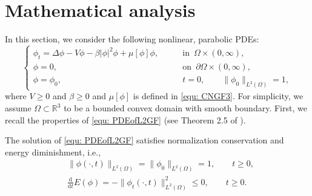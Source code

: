 \documentclass{siamart250211}
\def\R{\mathbb{R}}
\begin{document}
\section{Mathematical analysis}\label{sec: Mathematical analysis}

In this section, we consider the following nonlinear, parabolic PDEs:
\begin{equation}\label{equ: PDEofL2GF}
\begin{cases}
	\phi_t = \Delta \phi - V\phi - \beta |\phi|^2 \phi + \mu[\phi] \phi, \qquad & \text{in}\,\,\, \Omega \times (0,\infty),   \\
	 \phi = 0, \qquad & \text{on}\,\,\,\partial\Omega\times (0,\infty), \\
		\phi = \phi_0, \qquad & t = 0, \qquad \|\phi_0\|_{L^2(\Omega)} = 1,
		\end{cases}
\end{equation}
where $V \ge 0$ and $\beta \ge 0$ and $\mu[\phi]$ is defined in \eqref{equ: CNGF3}. For simplicity, we assume $\Omega \subset \R^3$ to be a bounded convex domain with smooth boundary. First, we recall the properties of \eqref{equ: PDEofL2GF} (see Theorem 2.5 of \cite{bao2004computing}).
\begin{prop}
    The solution of \eqref{equ: PDEofL2GF} satisfies normalization conservation and energy diminishment, i.e., 
    \begin{align*}
        & \|\phi(\cdot,t)\|_{L^2(\Omega)} = \|\phi_0\|_{L^2(\Omega)} = 1, \qquad t \ge 0, \\
        & \frac{\mathrm{d}}{\mathrm{d}t}E(\phi) = -\|\phi_t(\cdot,t)\|_{L^2(\Omega)}^2 \le 0, \qquad t \ge 0.
    \end{align*}
\end{prop}
\end{document}
